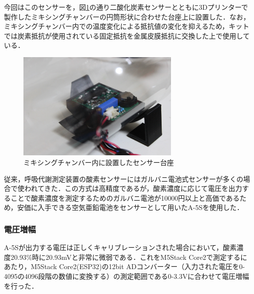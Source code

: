 今回はこのセンサーを，図\ref{fig:sensor_board}の通り二酸化炭素センサーとともに3Dプリンターで製作したミキシングチャンバーの円筒形状に合わせた台座上に設置した．なお，ミキシングチャンバー内での温度変化による抵抗値の変化を抑えるため，キットでは炭素抵抗が使用されている固定抵抗を金属皮膜抵抗に交換した上で使用している．

\begin{figure}[H]
  \begin{center}
    \includegraphics[width=8cm]{fig/sensor_board}
    \caption{ミキシングチャンバー内に設置したセンサー台座}
    \label{fig:sensor_board}
  \end{center}
\end{figure}

従来，呼吸代謝測定装置の酸素センサーにはガルバニ電池式センサーが多くの場合で使われてきた．この方式は高精度であるが，酸素濃度に応じて電圧を出力することで酸素濃度を測定するためのガルバニ電池が10000円以上と高価であるため，安価に入手できる空気亜鉛電池をセンサーとして用いたA-5Sを使用した．

\subsubsection{電圧増幅}

A-5Sが出力する電圧は正しくキャリブレーションされた場合において，酸素濃度20.93\%時に20.93mVと非常に微弱である．これをM5Stack Core2で測定するにあたり，M5Stack Core2(ESP32)の12bit ADコンバーター（入力された電圧を0-4095の4096段階の数値に変換する）の測定範囲である0-3.3Vに合わせて電圧増幅を行った．

